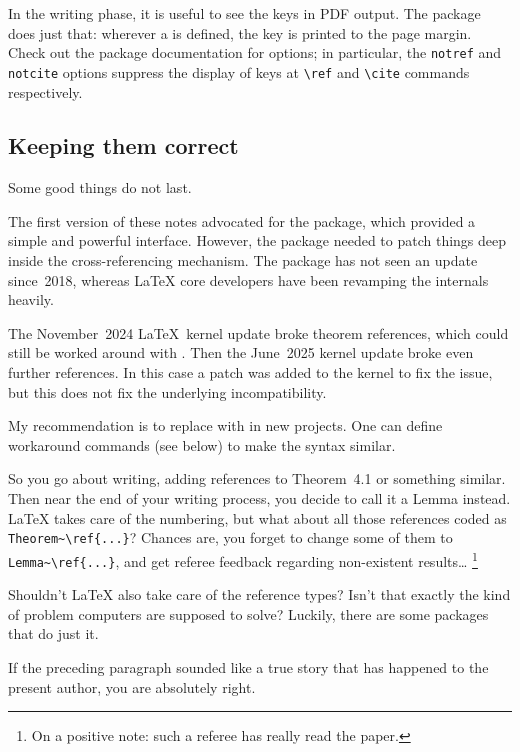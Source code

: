 In the writing phase, it is useful to see the keys in PDF output.
The  package does just that:
wherever a  is defined,
the key is printed to the page margin.
Check out the package documentation for options;
in particular, the \verb|notref| and \verb|notcite| options
suppress the display of keys at \verb|\ref| and \verb|\cite| commands respectively.



%
%
\subsection{Keeping them correct}\label{sec:cleveref}

\begin{warning}
Some good things do not last.

The first version of these notes advocated for the  package,
which provided a simple and powerful interface.
However, the package needed to patch things deep inside the cross-referencing mechanism.
The package has not seen an update since~2018,
whereas \LaTeX{} core developers have been revamping the internals heavily.

The November~2024 \LaTeX~kernel update broke theorem references,
which could still be worked around with .
Then the June~2025 kernel update broke even further references.
In this case a patch was added to the kernel to fix the issue,
but this does not fix the underlying incompatibility.

My recommendation is to replace  with  in new projects.
One can define workaround commands (see below) to make the syntax similar.
\end{warning}

So you go about writing, adding references to Theorem~4.1 or something similar.
Then near the end of your writing process,
you decide to call it a Lemma instead.
\LaTeX{} takes care of the numbering,
but what about all those references coded as \verb|Theorem~\ref{...}|?
Chances are, you forget to change some of them to \verb|Lemma~\ref{...}|,
and get referee feedback regarding non-existent results\dots%
\footnote{On a positive note: such a referee has really read the paper.}

Shouldn't \LaTeX{} also take care of the reference types?
Isn't that exactly the kind of problem computers are supposed to solve?
Luckily, there are some packages that do just it.

\begin{practices}
If the preceding paragraph sounded like a true story that has happened to the present author,
you are absolutely right.
\end{practices}

